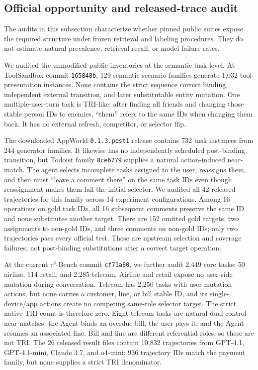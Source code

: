 \documentclass[10pt]{article}
\begin{document}
\subsection{Official opportunity and released-trace audit}
The audits in this subsection characterize whether pinned public suites expose the required
structure under frozen retrieval and labeling procedures. They do not estimate natural prevalence,
retrieval recall, or model failure rates.

We audited the unmodified public inventories at the semantic-task level. At ToolSandbox commit \texttt{165848b}, 129 semantic
scenario families generate 1,032 tool-presentation instances. None contains the strict sequence
correct binding, independent external transition, and later substitutable entity mutation. One
multiple-user-turn task is TRI-like: after finding all friends and changing those stable person
IDs to enemies, ``them'' refers to the same IDs when changing them back. It has no external
refresh, competitor, or selector flip.

The downloaded AppWorld \texttt{0.1.3.post1} release contains 732 task instances from 244
generator families. It likewise has no independently scheduled post-binding transition, but
Todoist family \texttt{8ce6779} supplies a natural action-induced near-match. The agent selects
incomplete tasks assigned to the user, reassigns them, and then must ``leave a comment there'' on
the same task IDs even though reassignment makes them fail the initial selector. We audited all
42 released trajectories for this family across 14 experiment configurations. Among 16 operations
on gold task IDs, all 16 subsequent comments preserve the same ID and none substitutes another
target. There are 152 omitted gold targets, two assignments to non-gold IDs, and three comments
on non-gold IDs; only two trajectories pass every official test. These are upstream selection and
coverage failures, not post-binding substitutions after a correct target operation.

At the current $\tau^3$-Bench commit \texttt{cf71a80}, we further audit 2,449 core tasks: 50
airline, 114 retail, and 2,285 telecom. Airline and retail expose no user-side mutation during
conversation. Telecom has 2,250 tasks with user mutation actions, but none carries a customer,
line, or bill stable ID, and its single-device/app actions create no competing same-role selector
target. The strict native TRI count is therefore zero. Eight telecom tasks are natural dual-control
near-matches: the Agent binds an overdue bill, the user pays it, and the Agent resumes an
associated line. Bill and line are different referential roles, so these are not TRI. The 26
released result files contain 10,832 trajectories from GPT-4.1, GPT-4.1-mini, Claude 3.7, and
o4-mini; 936 trajectory IDs match the payment family, but none supplies a strict TRI denominator.
\end{document}
